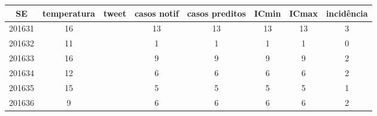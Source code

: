 \begin{tabular}{c|ccccccc}
  \hline
SE & temperatura & tweet & casos notif & casos preditos & ICmin & ICmax & incidência \\ 
  \hline
201631 & 16 &  & 13 & 13 & 13 & 13 & 3 \\ 
  201632 & 11 &  & 1 & 1 & 1 & 1 & 0 \\ 
  201633 & 16 &  & 9 & 9 & 9 & 9 & 2 \\ 
  201634 & 12 &  & 6 & 6 & 6 & 6 & 2 \\ 
  201635 & 15 &  & 5 & 5 & 5 & 5 & 1 \\ 
  201636 & 9 &  & 6 & 6 & 6 & 6 & 2 \\ 
   \hline
\end{tabular}
